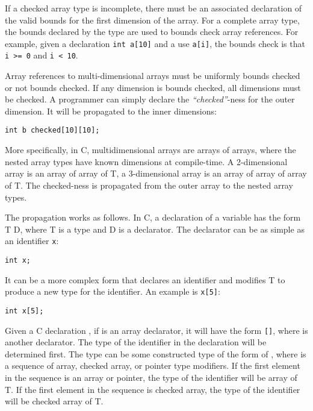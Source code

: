 If a checked array type is incomplete, there must be an associated
declaration of the valid bounds for the first dimension of the array.
For a complete array type, the bounds declared by the type are used to
bounds check array references. For example, given a declaration
\texttt{int a[10]} and a use \texttt{a[i]}, the bounds check is
that \texttt{i >= 0} and \texttt{i < 10}.

Array references to multi-dimensional arrays must be uniformly bounds
checked or not bounds checked. If any dimension is bounds checked, all
dimensions must be checked. A programmer can simply declare the
\emph{``checked''}-ness for the outer dimension. It will be propagated
to the inner dimensions:

\begin{verbatim}
int b checked[10][10];
\end{verbatim}

More specifically, in C, multidimensional arrays are arrays of arrays,
where the nested array types have known dimensions at compile-time. A
2-dimensional array is an array of array of T, a 3-dimensional array is
an array of array of array of T. The checked-ness is propagated from the
outer array to the nested array types.

The propagation works as follows. In C, a declaration of a variable has
the form T D, where T is a type and D is a declarator. The declarator
can be as simple as an identifier \texttt{x}:
\begin{verbatim}
int x;
\end{verbatim}

It can be a more complex form that declares an identifier and modifies T
to produce a new type for the identifier. An example is \texttt{x[5]}:

\begin{verbatim}
int x[5];
\end{verbatim}

Given a C declaration  , if  is an array
declarator, it will have the form
\texttt{[]},
where  is another declarator. The type of the identifier in the
declaration  will be determined first. The type can be some
constructed type of the form  of , where
 is a sequence of array, checked array, or pointer
type modifiers. If the first element in the 
sequence is an array or pointer, the type of the identifier will be
 array of T. If the first element in the
 sequence is checked array, the type of the
identifier will be  checked array of T.

